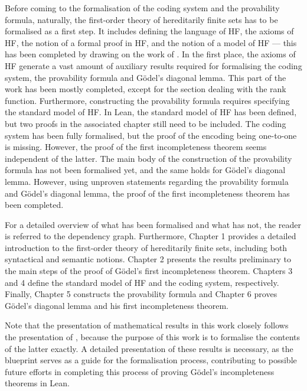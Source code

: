 Before coming to the formalisation of the coding system and the provability formula, naturally, 
the first-order theory of hereditarily finite sets has to be formalised as a first step.
It includes defining the language of HF, the axioms of HF, the notion of a formal proof in HF,
and the notion of a model of HF — this has been completed by drawing on the work of
\cite{han2020formal}.
In the first place, the axioms of HF generate a vast amount of auxiliary results required for 
formalising the coding system, the provability formula and Gödel's diagonal lemma. 
This part of the work has been mostly completed, 
except for the section dealing with the rank function.
Furthermore, constructing the provability formula requires specifying the standard model of HF.
In Lean, the standard model of HF has been defined, but two proofs in the associated chapter
still need to be included.
The coding system has been fully formalised, but the proof of the encoding being one-to-one
is missing. However, the proof of the first incompleteness theorem seems independent of the
latter.
The main body of the construction of the provability formula has not been formalised yet,
and the same holds for Gödel's diagonal lemma.
However, using unproven statements regarding the provability formula and Gödel's diagonal lemma, 
the proof of the first incompleteness theorem has been completed. 

For a detailed overview of what has been formalised and what has not, 
the reader is referred to the dependency graph.
Furthermore, 
Chapter 1 provides a detailed introduction to the first-order theory of hereditarily finite sets,
including both syntactical and semantic notions.
Chapter 2 presents the results preliminary to the main steps of the proof of Gödel's first
incompleteness theorem.
Chapters 3 and 4 define the standard model of HF and the coding system, respectively.
Finally, Chapter 5 constructs the provability formula and Chapter 6
proves Gödel's diagonal lemma and his first incompleteness theorem.

Note that the presentation of mathematical results in this work closely follows the presentation of  
\cite{swierczkowski2003finite}, because the purpose of this work is to formalise 
the contents of the latter exactly.
A detailed presentation of these results is necessary, 
as the blueprint serves as a guide for the formalisation process, 
contributing to possible future efforts in completing this process of proving
Gödel's incompleteness theorems in Lean.\\\\

